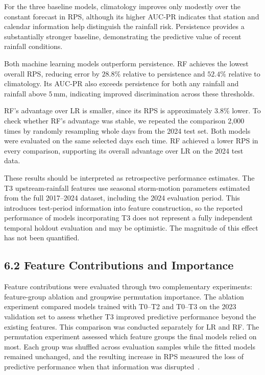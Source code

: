 \documentclass[11pt,a4paper]{article}
\begin{document}
For the three baseline models, climatology improves only modestly over the constant forecast in RPS, although its higher AUC-PR indicates that station and calendar information help distinguish the rainfall risk. Persistence provides a substantially stronger baseline, demonstrating the predictive value of recent rainfall conditions.


Both machine learning models outperform persistence. RF achieves the lowest overall RPS, reducing error by \(28.8\%\) relative to persistence and \(52.4\%\) relative to climatology. Its AUC-PR also exceeds persistence for both any rainfall and rainfall above \(5\,\mathrm{mm}\), indicating improved discrimination across these thresholds.


RF’s advantage over LR is smaller, since its RPS is approximately \(3.8\%\) lower. To check whether RF’s advantage was stable, we repeated the comparison 2,000 times by randomly resampling whole days from the 2024 test set. Both models were evaluated on the same selected days each time. RF achieved a lower RPS in every comparison, supporting its overall advantage over LR on the 2024 test data.


These results should be interpreted as retrospective performance estimates. The T3 upstream-rainfall features use seasonal storm-motion parameters estimated from the full 2017–2024 dataset, including the 2024 evaluation period. This introduces test-period information into feature construction, so the reported performance of models incorporating T3 does not represent a fully independent temporal holdout evaluation and may be optimistic. The magnitude of this effect has not been quantified.


\subsection*{6.2 Feature Contributions and Importance}
{}


Feature contributions were evaluated through two complementary experiments: feature-group ablation and groupwise permutation importance. The ablation experiment compared models trained with T0–T2 and T0–T3 on the 2023 validation set to assess whether T3 improved predictive performance beyond the existing features. This comparison was conducted separately for LR and RF. The permutation experiment assessed which feature groups the final models relied on most. Each group was shuffled across evaluation samples while the fitted models remained unchanged, and the resulting increase in RPS measured the loss of predictive performance when that information was disrupted~\citep{fisher2019}.
\end{document}
